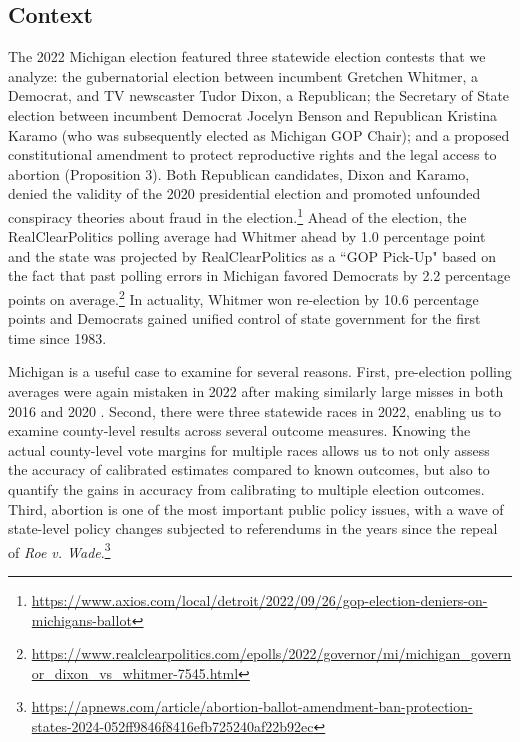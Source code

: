 \subsection{Context}

The 2022 Michigan election featured three statewide election contests that we analyze: the gubernatorial election between incumbent Gretchen Whitmer, a Democrat, and TV newscaster Tudor Dixon, a Republican; the Secretary of State election between incumbent Democrat Jocelyn Benson and Republican Kristina Karamo (who was subsequently elected as Michigan GOP Chair); and a proposed constitutional amendment to protect reproductive rights and the legal access to abortion (Proposition 3).
Both Republican candidates, Dixon and Karamo, denied the validity of the 2020 presidential election and promoted unfounded conspiracy theories about fraud in the election.\footnote{\url{https://www.axios.com/local/detroit/2022/09/26/gop-election-deniers-on-michigans-ballot}}
Ahead of the election, the RealClearPolitics polling average had Whitmer ahead by 1.0 percentage point and the state was projected by RealClearPolitics as a ``GOP Pick-Up" based on the fact that past polling errors in Michigan favored Democrats by 2.2 percentage points on average.\footnote{\url{https://www.realclearpolitics.com/epolls/2022/governor/mi/michigan_governor_dixon_vs_whitmer-7545.html} } 
In actuality, Whitmer won re-election by 10.6 percentage points and Democrats gained unified control of state government for the first time since 1983. 

Michigan is a useful case to examine for several reasons. 
First, pre-election polling averages were again mistaken in 2022 after making similarly large misses in both 2016 and 2020 \citep{Keta:2016,Cetal:2021}.
Second, there were three statewide races in 2022, enabling us to examine county-level results across several outcome measures.
Knowing the actual county-level vote margins for multiple races allows us to not only assess the accuracy of calibrated estimates compared to known outcomes, but also to quantify the gains in accuracy from calibrating to multiple election outcomes. 
Third, abortion is one of the most important public policy issues, with a wave of state-level policy changes subjected to referendums in the years since the repeal of \textit{Roe v. Wade}.\footnote{\url{https://apnews.com/article/abortion-ballot-amendment-ban-protection-states-2024-052ff9846f8416efb725240af22b92ec}}

